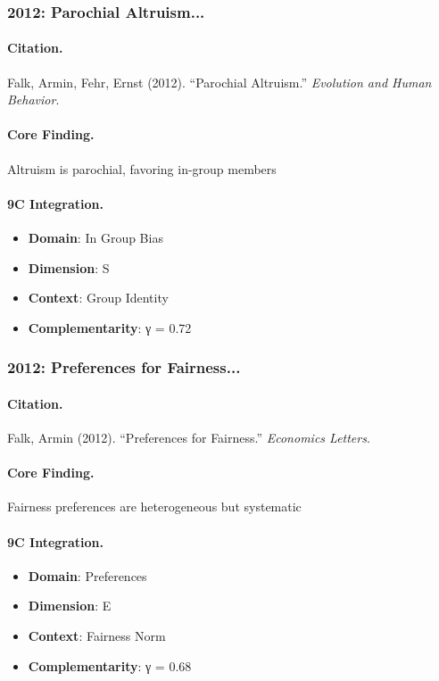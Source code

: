 \subsubsection{2012: Parochial Altruism...}

\paragraph{Citation.}
Falk, Armin, Fehr, Ernst (2012). ``Parochial Altruism.''
\textit{Evolution and Human Behavior}.

\paragraph{Core Finding.}
Altruism is parochial, favoring in-group members

\paragraph{9C Integration.}
\begin{itemize}[nosep]
  \item \textbf{Domain}: In Group Bias
  \item \textbf{Dimension}: S
  \item \textbf{Context}: Group Identity
  \item \textbf{Complementarity}: γ = 0.72
\end{itemize}


\subsubsection{2012: Preferences for Fairness...}

\paragraph{Citation.}
Falk, Armin (2012). ``Preferences for Fairness.''
\textit{Economics Letters}.

\paragraph{Core Finding.}
Fairness preferences are heterogeneous but systematic

\paragraph{9C Integration.}
\begin{itemize}[nosep]
  \item \textbf{Domain}: Preferences
  \item \textbf{Dimension}: E
  \item \textbf{Context}: Fairness Norm
  \item \textbf{Complementarity}: γ = 0.68
\end{itemize}


